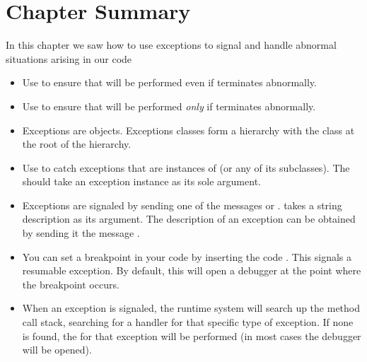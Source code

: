 \documentclass[a4paper,10pt,twoside]{book}
\begin{document}


\section{Chapter Summary}

In this chapter we saw how to use exceptions to signal and handle abnormal situations arising in our code

\begin{itemize}
\item Use  to ensure that  will be performed even if  terminates abnormally.

\item Use  to ensure that  will be performed \emph{only} if  terminates abnormally.

\item Exceptions are objects. Exceptions classes form a hierarchy with the class  at the root of the hierarchy.

\item Use  to catch exceptions that are instances of  (or any of its subclasses). The  should take an exception instance as its sole argument.

\item Exceptions are signaled by sending one of the messages  or .  takes a string description as its argument. The description of an exception can be obtained by sending it the message .

\item You can set a breakpoint in your code by inserting the code . This signals a resumable  exception. By default, this will open a debugger at the point where the breakpoint occurs.

\item When an exception is signaled, the runtime system will search up the method call stack, searching for a handler for that specific type of exception. If none is found, the  for that exception will be performed (\ie in most cases the debugger will be opened).


\end{itemize}
\end{document}
